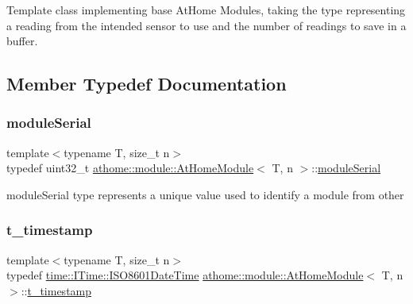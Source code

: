 Template class implementing base At\+Home Modules, taking the type representing a reading from the intended sensor to use and the number of readings to save in a buffer. 

\subsection{Member Typedef Documentation}
\mbox{\label{classathome_1_1module_1_1_at_home_module_aaa31c8eddb689010ef59deba4e1463c6}} 
\subsubsection{\texorpdfstring{module\+Serial}{moduleSerial}}
{\footnotesize\ttfamily template$<$typename T, size\+\_\+t n$>$ \\
typedef uint32\+\_\+t \mbox{\hyperlink{classathome_1_1module_1_1_at_home_module}{athome\+::module\+::\+At\+Home\+Module}}$<$ T, n $>$\+::\mbox{\hyperlink{classathome_1_1module_1_1_at_home_module_aaa31c8eddb689010ef59deba4e1463c6}{module\+Serial}}}

{\ttfamily module\+Serial} type represents a unique value used to identify a module from other \mbox{\label{classathome_1_1module_1_1_at_home_module_a077afdad789e433d59c588ec6c0f4594}} 
\subsubsection{\texorpdfstring{t\+\_\+timestamp}{t\_timestamp}}
{\footnotesize\ttfamily template$<$typename T, size\+\_\+t n$>$ \\
typedef \mbox{\hyperlink{structathome_1_1time_1_1_i_time_1_1_i_s_o8601_date_time}{time\+::\+I\+Time\+::\+I\+S\+O8601\+Date\+Time}} \mbox{\hyperlink{classathome_1_1module_1_1_at_home_module}{athome\+::module\+::\+At\+Home\+Module}}$<$ T, n $>$\+::\mbox{\hyperlink{classathome_1_1module_1_1_at_home_module_a077afdad789e433d59c588ec6c0f4594}{t\+\_\+timestamp}}}

